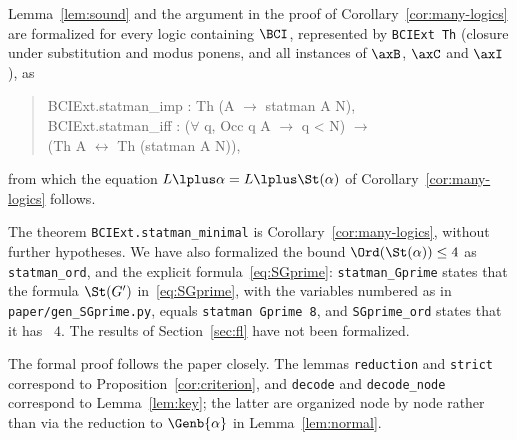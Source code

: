 Lemma~\ref{lem:sound} and the argument in the proof of
Corollary~\ref{cor:many-logics} are formalized for
every logic containing $\BCI$, represented by
\texttt{BCIExt Th} (closure under substitution and modus ponens, and all
instances of $\axB$, $\axC$ and $\axI$), as
\begin{quote}
\ttfamily BCIExt.statman\_imp : Th (A $\to$ statman A N),\\
BCIExt.statman\_iff : ($\forall$ q, Occ q A $\to$ q < N) $\to$\\
\hspace*{2em}(Th A $\leftrightarrow$ Th (statman A N)),
\end{quote}
from which the equation $L\lplus\alpha=L\lplus\St(\alpha)$ of
Corollary~\ref{cor:many-logics} follows.
\begin{sloppypar}
\noindent The theorem \texttt{BCIExt.statman\_minimal} is
Corollary~\ref{cor:many-logics}, without further hypotheses. We have also
formalized the  bound $\Ord(\St(\alpha))\le4$ as
\texttt{statman\_ord}, and the
explicit formula~\eqref{eq:SGprime}: \texttt{statman\_Gprime}
states that the formula $\St(G')$ in~\eqref{eq:SGprime}, with the
variables numbered as in \texttt{paper/gen\_SGprime.py}, equals
\texttt{statman Gprime 8}, and \texttt{SGprime\_ord} states that it has
~$4$. The results of Section~\ref{sec:fl} have not been
formalized.
\end{sloppypar}

The formal proof follows the paper closely. The lemmas \texttt{reduction}
and \texttt{strict} correspond to Proposition~\ref{cor:criterion}, and
\texttt{decode} and \texttt{decode\_node} correspond to
Lemma~\ref{lem:key}; the latter are organized node by node rather than via
the reduction to $\Genb{\alpha}$ in Lemma~\ref{lem:normal}.
